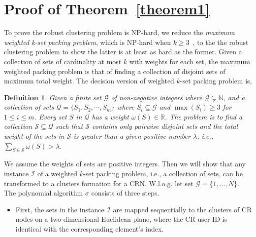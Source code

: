 \documentclass[10pt,journal,compsoc]{IEEEtran}
\makeatletter
\theoremstyle{mytheoremstyle}
\theoremstyle{mytheoremstyle}
\theoremstyle{mytheoremstyle}
\newtheorem{mydef}{Definition}%
\renewenvironment{proof}[1][\proofname]{%
      \par\pushQED{\qed}\fontfamily{ptm}\selectfont%
      \topsep6\p@\@plus6\p@\relax
      \trivlist\item[\hskip\labelsep\bfseries#1\@addpunct{.}]%
      \ignorespaces
    }{%
      \popQED\endtrivlist\@endpefalse
    }
\newcommand{\ie}{i.e., }
\makeatother
\begin{document}
\section*{Proof of Theorem~\ref{theorem1}}
\label{proof_theorem1}
\begin{proof}
To prove the robust clustering problem is NP-hard, we reduce the \textit{maximum weighted k-set packing problem}, which is NP-hard when $k\geqslant 3$~\cite{Computers_a_Intractability}, to the the robust clustering problem to show the latter is at least as hard as the former.
Given a collection of sets of cardinality at most $k$ with weights for each set, the maximum weighted packing problem is that of finding a collection of disjoint sets of maximum total weight.
The decision version of weighted $k$-set packing problem is,
\begin{mydef}
\label{def_kset_packing}
Given a finite set $\mathcal{G}$ of non-negative integers where $\mathcal{G} \subsetneq \mathbb{N}$, and a collection of sets $\mathcal{Q}=\{S_1,S_2,\cdots,S_m\}$ where $S_i \subseteq \mathcal{G}$ and $\max(S_i)\geq 3$ for $1 \leq i \leq m$.
Every set $S$ in $\mathcal{Q}$ has a weight $\omega(S) \in \mathbb{R}$. 
%
The problem is to find a collection $\mathcal{S} \subseteq \mathcal{Q}$ such that $\mathcal{S}$ contains only pairwise disjoint sets and the total weight of the sets in $\mathcal{S}$ is greater than a given positive number $\lambda$, i.e., $\sum_{S \in \mathcal{S}} \omega(S) > \lambda$.
\end{mydef}

We assume the weights of sets are positive integers.
Then we will show that any instance $\mathcal{I}$ of a weighted $k$-set packing problem, \ie a collection of sets, can be transformed to a clusters formation for a CRN.
W.l.o.g. let set $\mathcal{G} = \{ 1, \ldots , N \}$.
The polynomial algorithm $\sigma$ consists of three steps.

\begin{itemize}


\item First, the sets in the instance $\mathcal{I}$ are mapped sequentially to the clusters of CR nodes on a two-dimensional Euclidean plane, where the CR user ID is identical with the corresponding element's index.


\end{itemize}
\end{proof}
\end{document}
